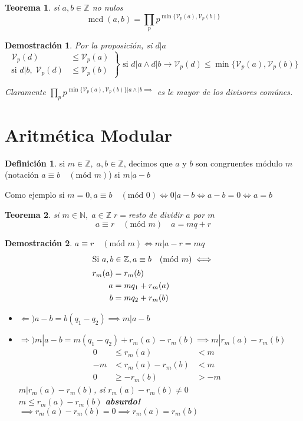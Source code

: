 \documentclass[9pt,a4paper,draft]{article}
\theoremstyle{definition}
\newtheorem{defi}{Definición}
\theoremstyle{plain}
\newtheorem{teo}{Teorema}
\newtheorem{demo}{Demostración}[teo]
\DeclareMathOperator{\mcd}{mcd}
\newcommand{\modu}[1]{\quad(\text{mód }#1)}
\begin{document}
\begin{teo} si $a,b\in{\mathbb{Z}}$ no nulos
$$\mcd(a,b)=\prod_{p}p^{\min\{\mathcal{V}_p(a), \mathcal{V}_p(b)\}}$$
\end{teo}

\begin{demo}
Por la proposición, si $d|a$\\

\[
\left. \begin{align*}
\mathcal{V}_p(d) &\leq \mathcal{V}_p(a) \\
\text{si } d|b,\; \mathcal{V}_p(d) &\leq \mathcal{V}_p(b)
\end{align*} \right\}
\text{ si } d|a \land d|b \to \mathcal{V}_p(d) \leq \min\{\mathcal{V}_p(a), \mathcal{V}_p(b)\}
\]

Claramente $\prod_{p}p^{\min\{\mathcal{V}_p(a), \mathcal{V}_p(b)\} |a \land |b \implies}$ es le mayor de los divisores comúnes.
\end{demo}

\part{Aritmética Modular}

\begin{defi} si $m\in{\mathbb{Z}},\; a,b\in{\mathbb{Z}}$, decimos que $a$ y $b$ son congruentes módulo $m$ (notación $a \equiv b\modu{m}$) si $m|a-b$\end{defi}

Como ejemplo si $m=0, a \equiv b \modu{0} \iff 0|a-b \iff a-b=0 \iff a=b$

\begin{teo} si $m\in{\mathbb{N}},\; a\in{\mathbb{Z}}\; r=$resto de dividir $a$ por $m$
$$ a \equiv r \modu{m} \quad a=mq+r$$
\end{teo}

\begin{demo}
$a\equiv r \modu{m} \iff m|a-r = mq$ \\
\begin{align*}
\intertext{Si $a,b\in{\mathbb{Z}, a\equiv b \modu{m} \iff}$}
r_m(a) &= r_m(b) \\
a &= mq_1+r_m(a) \\
b &= mq_2+r_m(b)
\end{align*}

\begin{itemize}
\item $\Leftarrow) a-b=b(q_1-q_2) \implies m|a-b$
\item $\Rightarrow) m|a-b = m(q_1-q_2)+r_m(a)-r_m(b) \implies m|r_m(a)-r_m(b)$
\begin{align*}
0 & \leq r_m(a) & < m &\\
-m & < r_m(a) - r_m(b) & < m &\\
0 & \geq -r_m(b) & > -m &
\end{align*}
$m|r_m(a)-r_m(b)$, si $r_m(a)-r_m(b)\neq{0}$ \\
$ m \leq r_m(a) - r_m(b)$ {\bfseries absurdo!} $\implies r_m(a) - r_m(b)=0 \implies r_m(a)=r_m(b)$ 
\end{itemize}
\end{demo}
\end{document}
